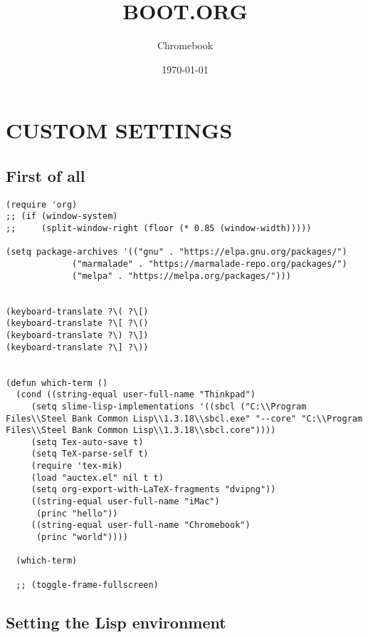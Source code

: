 \documentclass[11pt]{article}
\author{Chromebook}
\date{\today}
\title{BOOT.ORG}
\begin{document}
\maketitle
\tableofcontents





\section{CUSTOM SETTINGS}
\label{sec-1}


\subsection{First of all}
\label{sec-1-1}

\begin{verbatim}
(require 'org)
;; (if (window-system)
;;     (split-window-right (floor (* 0.85 (window-width)))))

(setq package-archives '(("gnu" . "https://elpa.gnu.org/packages/")
			 ("marmalade" . "https://marmalade-repo.org/packages/")
			 ("melpa" . "https://melpa.org/packages/")))


(keyboard-translate ?\( ?\[)
(keyboard-translate ?\[ ?\()
(keyboard-translate ?\) ?\])
(keyboard-translate ?\] ?\))


(defun which-term ()
  (cond ((string-equal user-full-name "Thinkpad")
	 (setq slime-lisp-implementations '((sbcl ("C:\\Program Files\\Steel Bank Common Lisp\\1.3.18\\sbcl.exe" "--core" "C:\\Program Files\\Steel Bank Common Lisp\\1.3.18\\sbcl.core"))))
	 (setq Tex-auto-save t)
	 (setq TeX-parse-self t)
	 (require 'tex-mik)
	 (load "auctex.el" nil t t)
	 (setq org-export-with-LaTeX-fragments "dvipng"))
	 ((string-equal user-full-name "iMac")
	  (princ "hello"))
	 ((string-equal user-full-name "Chromebook")
	  (princ "world"))))

  (which-term)

  ;; (toggle-frame-fullscreen)
\end{verbatim}


\subsection{Setting the Lisp environment}
\label{sec-1-2}
\end{document}
